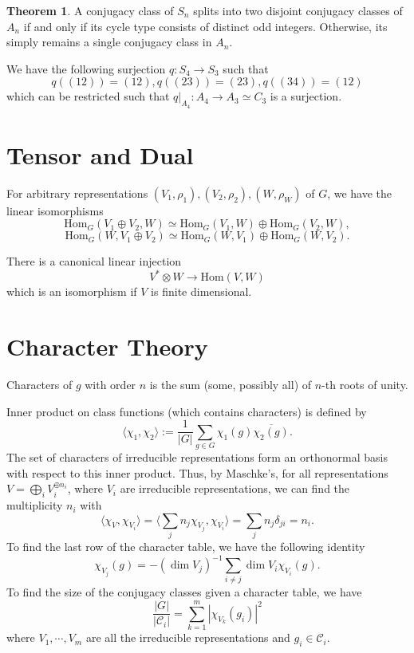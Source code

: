 \documentclass[]{article}
\theoremstyle{definition}
\newtheorem*{theorem}{Theorem}
\begin{document}
\begin{theorem}
  A conjugacy class of \(S_n\) splits into two disjoint conjugacy classes of \(A_n\) if and only 
  if its cycle type consists of distinct odd integers. Otherwise, its simply remains a single 
  conjugacy class in \(A_n\).
\end{theorem}

We have the following surjection \(q : S_4 \to S_3\) such that 
\[q((12)) = (12), q((23)) = (23), q((34)) = (12)\]
which can be restricted such that \(q|_{A_4} : A_4 \to A_3 \simeq C_3\) is a surjection.

\section*{Tensor and Dual}

For arbitrary representations \((V_1, \rho_1), (V_2, \rho_2), (W, \rho_W)\) of \(G\), 
we have the linear isomorphisms 
\[\text{Hom}_G(V_1 \oplus V_2, W) \simeq \text{Hom}_G(V_1, W) \oplus \text{Hom}_G(V_2, W),\]
\[\text{Hom}_G(W, V_1 \oplus V_2) \simeq \text{Hom}_G(W, V_1) \oplus \text{Hom}_G(W, V_2).\]

There is a canonical linear injection 
\[V^* \otimes W \to \text{Hom}(V, W)\] 
which is an isomorphism if \(V\) is finite dimensional.

\section*{Character Theory}

Characters of \(g\) with order \(n\) is the sum (some, possibly all) of \(n\)-th roots of unity.

Inner product on class functions (which contains characters) is defined by 
\[\langle \chi_1, \chi_2 \rangle := \frac{1}{|G|} \sum_{g \in G} \chi_1(g)\overline{\chi_2(g)}.\]
The set of characters of irreducible representations form an orthonormal basis with respect to 
this inner product. Thus, by Maschke's, for all representations \(V = \bigoplus_i V_i^{\oplus n_i}\),
where \(V_i\) are irreducible representations, we can find the multiplicity \(n_i\) with 
\[\langle \chi_V, \chi_{V_i} \rangle = \langle \sum_j n_j \chi_{V_j}, \chi_{V_i}\rangle = 
  \sum_j n_j \delta_{ji} = n_i.\]
To find the last row of the character table, we have the following identity
\[\chi_{V_j}(g) = -(\dim V_j)^{-1} \sum_{i \neq j} \dim V_i \chi_{V_i}(g).\]
To find the size of the conjugacy classes given a character table, we have 
\[\frac{|G|}{|\mathcal{C}_i|} = \sum_{k = 1}^m |\chi_{V_k}(g_i)|^2\]
where \(V_1, \cdots, V_m\) are all the irreducible representations and \(g_i \in \mathcal{C}_i\).
\end{document}
